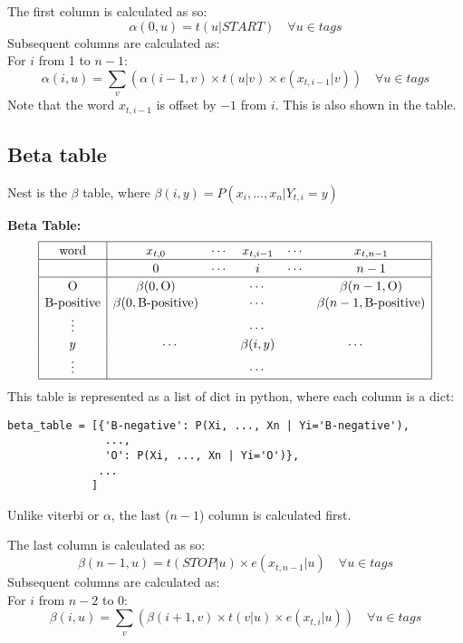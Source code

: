 \documentclass[12pt]{article}
\begin{document}
The first column is calculated as so:
\[ \alpha(0,u) = t(u|START) \quad \forall u \in {tags}\]
Subsequent columns are calculated as:\\
For \(i\) from 1 to \(n-1\):
\[ \alpha(i,u) = \sum_v \left( \alpha(i-1,v) \times t(u|v) \times e(x_{t,i-1}|v) \right) \quad \forall u \in {tags}\]
Note that the word \(x_{t,i-1}\) is offset by \(-1\) from \(i\). This is also shown in the table.

\subsection{Beta table}
Nest is the \(\beta\) table, where \(\beta(i,y) = P(x_i,...,x_n | Y_{t,i}=y) \)

\textbf{Beta Table:}
\[
\begin{array}{|c|ccccc|}
\hline \rule{0pt}{1em}
\mbox{word} & x_{t,0} & \cdots & x_{t,i-1} & \cdots & x_{t,n-1} \\
\hline \rule{0pt}{1em}
& 0 & \cdots & i & \cdots & n-1 \\
\hline \rule{0pt}{1em}
\mbox{O}          & \beta(0,\mbox{O}) & \multicolumn{3}{c}{\cdots} & \beta(n-1,\mbox{O}) \\[0.1em]
\mbox{B-positive} & \beta(0,\mbox{B-positive}) & \multicolumn{3}{c}{\cdots} & \beta(n-1,\mbox{B-positive}) \\[0.1em]
\vdots &          & \multicolumn{3}{c}{\cdots} &            \\[0.1em]
y      & \multicolumn{2}{c}{\cdots} & \beta(i,y) & \multicolumn{2}{c|}{\cdots} \\[0.1em]
\vdots &          & \multicolumn{3}{c}{\cdots} &            \\[0.1em]
\hline
\end{array}
\]
This table is represented as a list of dict in python, where each column is a dict:
\begin{verbatim}
beta_table = [{'B-negative': P(Xi, ..., Xn | Yi='B-negative'),
               ...,
               'O': P(Xi, ..., Xn | Yi='O')},
              ...
             ]
\end{verbatim}

Unlike viterbi or \(\alpha\), the last (\(n-1\)) column is calculated first.

The last column is calculated as so:
\[ \beta(n-1,u) = t(STOP|u) \times e(x_{t,n-1}|u) \quad \forall u \in {tags}\]
Subsequent columns are calculated as:\\
For \(i\) from \(n-2\) to 0:
\[ \beta(i,u) = \sum_v \left( \beta(i+1,v) \times t(v|u) \times e(x_{t,i}|u) \right) \quad \forall u \in {tags} \]
\end{document}
